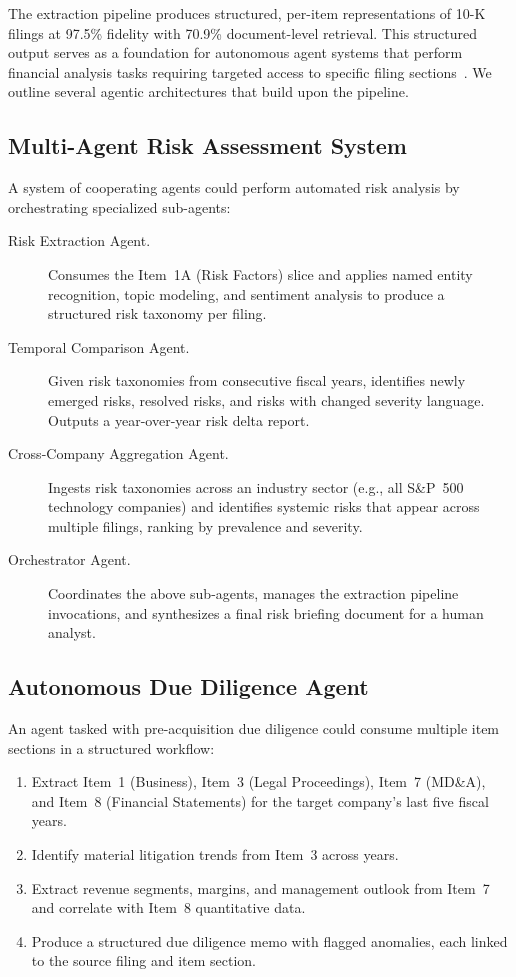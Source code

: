 \documentclass[12pt,letterpaper,oneside]{article}
\begin{document}
The extraction pipeline produces structured, per-item representations
of 10-K filings at 97.5\% fidelity with 70.9\% document-level
retrieval. This structured output serves as a foundation for
autonomous agent systems that perform financial analysis tasks
requiring targeted access to specific filing
sections~\cite{zhang2023form10k}. We outline several agentic
architectures that build upon the pipeline.

\subsection{Multi-Agent Risk Assessment System}

A system of cooperating agents could perform automated risk
analysis by orchestrating specialized sub-agents:

\begin{description}
  \item[Risk Extraction Agent.]
    Consumes the Item~1A (Risk Factors) slice and applies named
    entity recognition, topic modeling, and sentiment analysis to
    produce a structured risk taxonomy per filing.

  \item[Temporal Comparison Agent.]
    Given risk taxonomies from consecutive fiscal years, identifies
    newly emerged risks, resolved risks, and risks with changed
    severity language. Outputs a year-over-year risk delta report.

  \item[Cross-Company Aggregation Agent.]
    Ingests risk taxonomies across an industry sector (e.g., all
    S\&P~500 technology companies) and identifies systemic risks
    that appear across multiple filings, ranking by prevalence and
    severity.

  \item[Orchestrator Agent.]
    Coordinates the above sub-agents, manages the extraction pipeline
    invocations, and synthesizes a final risk briefing document for
    a human analyst.
\end{description}

\subsection{Autonomous Due Diligence Agent}

An agent tasked with pre-acquisition due diligence could consume
multiple item sections in a structured workflow:

\begin{enumerate}
  \item Extract Item~1 (Business), Item~3 (Legal Proceedings),
    Item~7 (MD\&A), and Item~8 (Financial Statements) for the
    target company's last five fiscal years.
  \item Identify material litigation trends from Item~3 across years.
  \item Extract revenue segments, margins, and management outlook
    from Item~7 and correlate with Item~8 quantitative data.
  \item Produce a structured due diligence memo with flagged
    anomalies, each linked to the source filing and item section.
\end{enumerate}
\end{document}
